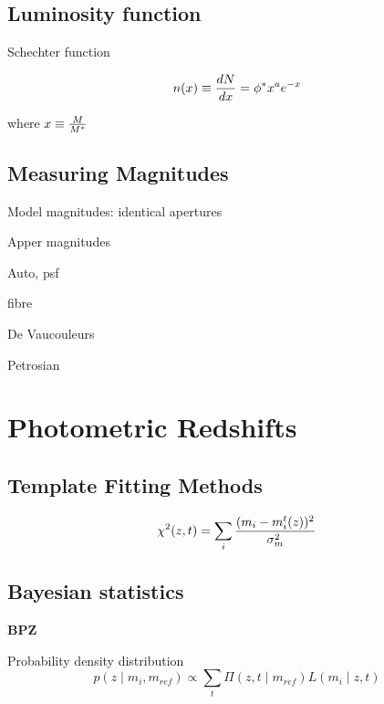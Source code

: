 \subsection{Luminosity function}

Schechter function 

\begin{equation}
n(x) \equiv {dN \over dx} = \phi^* x^a e^{-x} 
\end{equation}

where $x \equiv {M \over M^*}$

\subsection{Measuring Magnitudes}

Model magnitudes: identical apertures

Apper magnitudes

Auto, psf 

fibre

De Vaucouleurs

Petrosian

\section{Photometric Redshifts}

\subsection{Template Fitting Methods}

\begin{equation}
\chi^2(z,t)=\sum_i {(m_i -  m_i^t(z))^2 \over  \sigma_m^2}
\end{equation}




\subsection{Bayesian statistics} 

\textbf{BPZ} \citep{Benitez2000}

Probability density distribution
\begin{equation}
p(z \mid m_i, m_{ref}) \propto \sum_t \Pi(z,t \mid m_{ref})L(m_i \mid z,t)
\end{equation}

